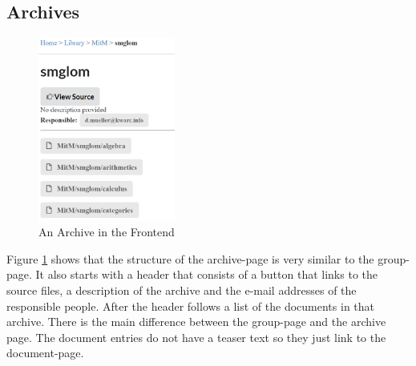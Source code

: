 \documentclass[11pt,a4paper]{article}
\begin{document}
\subsection{Archives}
\begin{figure}[H]
\centerline{\includegraphics[width=0.4\textwidth]{archive.png}}
\caption{An Archive in the Frontend}
\label{fig:archive}
\end{figure}
Figure \ref{fig:archive} shows that the structure of the archive-page is very similar to the group-page.
It also starts with a header that consists of a button that links to the source files, a description of the archive and the e-mail addresses of the responsible people. 
\newline \newline
After the header follows a list of the documents in that archive.
There is the main difference between the group-page and the archive page.
The document entries do not have a teaser text so they just link to the document-page.
\end{document}
